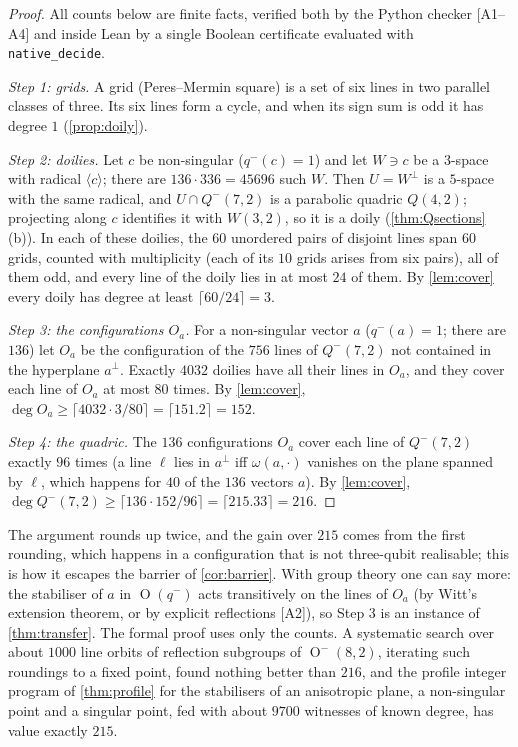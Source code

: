 \documentclass[a4paper,onecolumn,11pt,unpublished,nopdfoutputerror]{quantumarticle}
\theoremstyle{definition}
\newcommand{\cert}[1]{\textcolor{certblue}{\textsf{[#1]}}}
\renewcommand{\deg}{\operatorname{deg}}
\newcommand{\Orth}{\operatorname{O}}
\newcommand{\W}[1]{W(#1,2)}
\newcommand{\Qm}[1]{Q^{-}(#1,2)}
\begin{document}
\begin{proof}
All counts below are finite facts, verified both by the Python checker \cert{A1--A4} and inside Lean by a single
Boolean certificate evaluated with \texttt{native\_decide}.

\emph{Step 1: grids.} A grid (Peres--Mermin square) is a set of six lines in two parallel classes of three. Its six
lines form a cycle, and when its sign sum is odd it has degree $1$ (\cref{prop:doily}).

\emph{Step 2: doilies.} Let $c$ be non-singular ($q^-(c)=1$) and let $W\ni c$ be a $3$-space with radical $\langle
c\rangle$; there are $136\cdot336=45696$ such $W$. Then $U=W^\perp$ is a $5$-space with the same radical, and
$U\cap\Qm7$ is a parabolic quadric $Q(4,2)$; projecting along $c$ identifies it with $\W3$, so it is a doily
(\cref{thm:Qsections}(b)). In each of these doilies, the $60$ unordered pairs of disjoint lines span $60$ grids, counted with
multiplicity (each of its $10$ grids arises from six pairs), all of them odd, and every line of the doily lies in at most $24$ of them. By \cref{lem:cover}
every doily has degree at least $\lceil60/24\rceil=3$.

\emph{Step 3: the configurations $O_a$.} For a non-singular vector $a$ ($q^-(a)=1$; there are $136$) let $O_a$ be the
configuration of the $756$ lines of $\Qm7$ not contained in the hyperplane $a^\perp$. Exactly $4032$ doilies have all
their lines in $O_a$, and they cover each line of $O_a$ at most $80$ times. By \cref{lem:cover},
$\deg O_a\ge\lceil4032\cdot3/80\rceil=\lceil151.2\rceil=152$.

\emph{Step 4: the quadric.} The $136$ configurations $O_a$ cover each line of $\Qm7$ exactly $96$ times (a line
$\ell$ lies in $a^\perp$ iff $\omega(a,\cdot)$ vanishes on the plane spanned by $\ell$, which happens for $40$ of
the $136$ vectors $a$). By \cref{lem:cover},
$\deg\Qm7\ge\lceil136\cdot152/96\rceil=\lceil215.33\rceil=216$.
\end{proof}

The argument rounds up twice, and the gain over $215$ comes from the first rounding, which happens in a
configuration that is not three-qubit realisable; this is how it escapes the barrier of \cref{cor:barrier}. With
group theory one can say more: the stabiliser of $a$ in $\Orth(q^-)$ acts transitively on the lines of $O_a$ (by
Witt's extension theorem, or by explicit reflections \cert{A2}), so Step 3 is an instance of \cref{thm:transfer}.
The formal proof uses only the counts. A systematic search over about $1000$ line orbits of reflection subgroups of
$\Orth^-(8,2)$, iterating such roundings to a fixed point, found nothing better than $216$, and the profile integer
program of \cref{thm:profile} for the stabilisers of an anisotropic plane, a non-singular point and a singular
point, fed with about $9700$ witnesses of known degree, has value exactly $215$.
\end{document}
